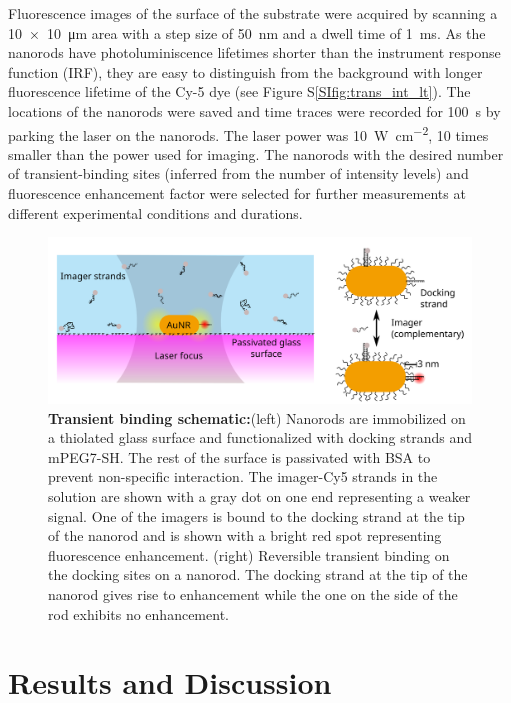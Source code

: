 Fluorescence images of the surface of the substrate were acquired by scanning a \SI[product-units=power]{10x10}{\um} area with a step size of \SI{50}{\nm} and a dwell time of \SI{1}{\ms}.
As the nanorods have photoluminiscence lifetimes shorter than the instrument response function (IRF), they are easy to distinguish from the background with longer fluorescence lifetime of the Cy-5 dye (see Figure S\ref{SIfig:trans_int_lt}).
The locations of the nanorods were saved and time traces were recorded for \SI{100}{\s} by parking the laser on the nanorods.
The laser power was \SI[per-mode=repeated-symbol]{10}{\watt\per\cm\squared}, 10 times smaller than the power used for imaging.
The nanorods with the desired number of transient-binding sites (inferred from the number of intensity levels) and fluorescence enhancement factor were selected for further measurements at different experimental conditions and durations.
\begin{figure}
	\centering
	\includegraphics[width=\linewidth]{scheme}
	\caption{\textbf{Transient binding schematic:}(left) Nanorods are immobilized on a thiolated glass surface and functionalized with docking strands and mPEG7-SH.
	The rest of the surface is passivated with BSA to prevent non-specific interaction.
	The imager-Cy5 strands in the solution  are shown with a gray dot on one end representing a weaker signal.
	One of the imagers is bound to the docking strand at the tip of the nanorod and is shown with a bright red spot representing fluorescence enhancement.
	(right) Reversible transient binding on the docking sites on a nanorod. The docking strand at the tip of the nanorod gives rise to enhancement while the one on the side of the rod exhibits no enhancement.}
  	\label{sch_trans:setup}
\end{figure}


\section{Results and Discussion}
